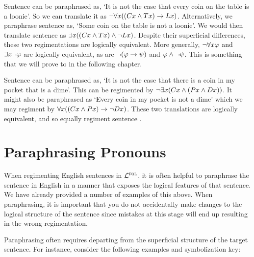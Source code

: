 Sentence  can be paraphrased as, `It is not the case that every coin on the table is a loonie'.
So we can translate it as $\neg \forall x((Cx \wedge Tx) \rightarrow Lx)$.
Alternatively, we paraphrase sentence  as, `Some coin on the table is not a loonie'.
We would then translate sentence  as $\exists x((Cx \wedge Tx) \wedge \neg Lx)$.
Despite their superficial differences, these two regimentations are logically equivalent.
More generally, $\neg\forall x\varphi{}$ and $\exists x\neg\varphi{}$ are logically equivalent, as are $\neg(\varphi{}\rightarrow\psi{})$ and $\varphi{}\wedge\neg\psi{}$.
This is something that we will prove to in the following chapter.

Sentence  can be paraphrased as, `It is not the case that there is a coin in my pocket that is a dime'.
This can be regimented by $\neg\exists x(Cx \wedge (Px \wedge Dx))$.
It might also be paraphrased as `Every coin in my pocket is not a dime' which we may regiment by $\forall x((Cx \wedge Px) \rightarrow \neg Dx)$.
These two translations are logically equivalent, and so equally regiment sentence .






\section{Paraphrasing Pronouns}

When regimenting English sentences in $\mathcal{L}^{\textsc{fol}}$, it is often helpful to paraphrase the sentence in English in a manner that exposes the logical features of that sentence.
We have already provided a number of examples of this above.
When paraphrasing, it is important that you do not accidentally make changes to the logical structure of the sentence since mistakes at this stage will end up resulting in the wrong regimentation.

Paraphrasing often requires departing from the superficial structure of the target sentence.
For instance, consider the following examples and symbolization key:

\begin{earg} \label{pronoun}
\end{earg}

